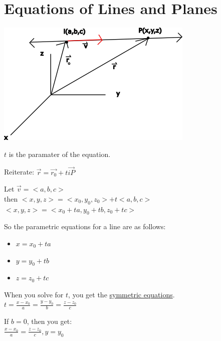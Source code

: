 \documentclass[12pt]{article}
\begin{document}
\section{Equations of Lines and Planes} 

\includegraphics{line3d}

$t$ is the paramater of the equation.

Reiterate: $\vec{r} = \vec{r_0} +t \vec{iP} $

Let $\vec{v}=<a,b,c> $\\%
then $<x,y,z>=<x_0,y_0,z_0> + t<a,b,c>$\\%
$<x,y,z>=<x_0+ta,y_0+tb, z_0+tc>$

So the parametric equations for a line are as follows:
\begin{itemize}
	\item $x=x_0+ta$
	\item $y=y_0+tb$
	\item $z=z_0+tc$
\end{itemize}

When you solve for $t$, you get the \underline{symmetric equations}.\\%
$t=\frac{x-x_0}{a}=\frac{y-y_0}{b}=\frac{z-z_0}{c}$

If $b=0$, then you get:\\%
$\frac{x-x_0}{a}=\frac{z-z_0}{c}, y=y_0$
\end{document}

